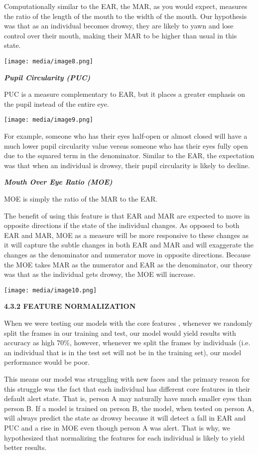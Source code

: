 \documentclass[a4paper,12pt]{article}
\begin{document}
Computationally similar to the EAR, the MAR, as you would expect,
measures the ratio of the length of the mouth to the width of the mouth.
Our hypothesis was that as an individual becomes drowsy, they are likely
to yawn and lose control over their mouth, making their MAR to be higher
than usual in this state.

\texttt{[image: media/image8.png]}

\emph{\textbf{Pupil Circularity (PUC)}}

PUC is a measure complementary to EAR, but it places a greater emphasis
on the pupil instead of the entire eye.

\texttt{[image: media/image9.png]}

For example, someone who has their eyes half-open or almost closed will
have a much lower pupil circularity value versus someone who has their
eyes fully open due to the squared term in the denominator. Similar to
the EAR, the expectation was that when an individual is drowsy, their
pupil circularity is likely to decline.

\emph{\textbf{Mouth Over Eye Ratio (MOE)}}

MOE is simply the ratio of the MAR to the EAR.

The benefit of using this feature is that EAR and MAR are expected to
move in opposite directions if the state of the individual changes. As
opposed to both EAR and MAR, MOE as a measure will be more responsive to
these changes as it will capture the subtle changes in both EAR and MAR
and will exaggerate the changes as the denominator and numerator move in
opposite directions. Because the MOE takes MAR as the numerator and EAR
as the denominator, our theory was that as the individual gets drowsy,
the MOE will increase.

\texttt{[image: media/image10.png]}

\textbf{4.3.2 FEATURE NORMALIZATION}

When we were testing our models with the core features , whenever we
randomly split the frames in our training and test, our model would
yield results with accuracy as high 70\%, however, whenever we split the
frames by individuals (i.e. an individual that is in the test set will
not be in the training set), our model performance would be poor.

This means our model was struggling with new faces and the primary
reason for this struggle was the fact that each individual has different
core features in their default alert state. That is, person A may
naturally have much smaller eyes than person B. If a model is trained on
person B, the model, when tested on person A, will always predict the
state as drowsy because it will detect a fall in EAR and PUC and a rise
in MOE even though person A was alert. That is why, we hypothesized that
normalizing the features for each individual is likely to yield better
results.
\end{document}
